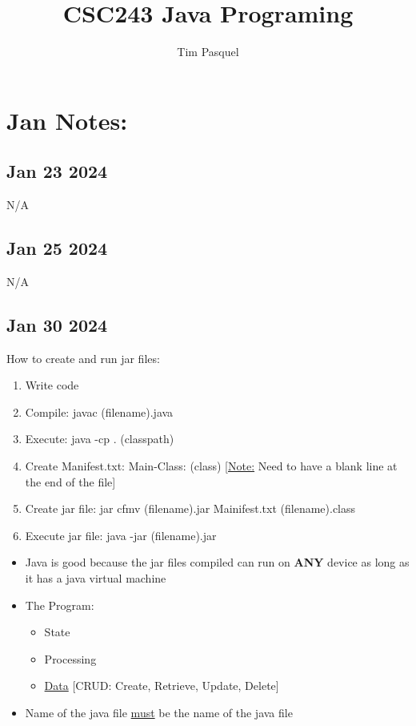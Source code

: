 \documentclass[12pt]{article}
\author{Tim Pasquel}
\title{CSC243 Java Programing}
\begin{document}
\maketitle

\titlepage

\section{Jan Notes:}

\subsection*{Jan 23 2024}

N/A

\subsection*{Jan 25 2024}

N/A

\subsection*{Jan 30 2024}

How to create and run jar files:

\begin{enumerate}
		  \item Write code 
		  \item Compile: javac (filename).java
		  \item Execute: java -cp . (classpath)
		  \item Create Manifest.txt: Main-Class: (class) [\underline{Note:} Need to have a blank line 
					 at the end of the file]
		  \item Create jar file: jar cfmv (filename).jar Mainifest.txt (filename).class
		  \item Execute jar file: java -jar (filename).jar
\end{enumerate}

\begin{itemize}
		  \item Java is good because the jar files compiled can run on \textbf{ANY} device
					 as long as it has a java virtual machine
		  \item The Program:
					 \begin{itemize}
								\item State
								\item Processing
								\item \underline{Data} [CRUD: Create, Retrieve, Update, Delete]
					 \end{itemize}
		  \item Name of the java file \underline{must} be the name of the java file
\end{itemize}
\end{document}
